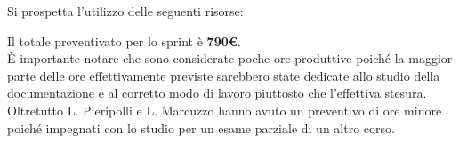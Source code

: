 Si prospetta l'utilizzo delle seguenti risorse:
\begin{table}[H]
	\centering
	\caption{Sprint 1: Preventivo}
\end{table}

Il totale preventivato per lo sprint è \textbf{790€}.\\
È importante notare che sono considerate poche ore produttive poiché la maggior parte delle ore effettivamente previste sarebbero state dedicate allo studio della documentazione e al corretto modo di lavoro piuttosto che l'effettiva stesura.\\
Oltretutto L. Pieripolli e L. Marcuzzo hanno avuto un preventivo di ore minore poiché impegnati con lo studio per un esame parziale di un altro corso.

